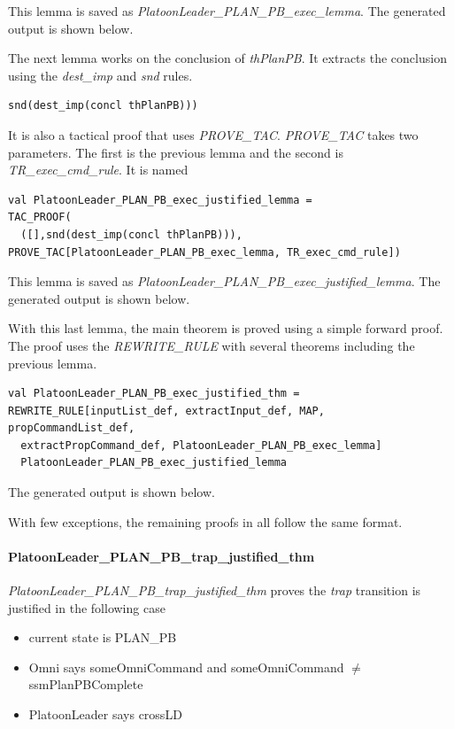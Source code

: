 \documentclass[../../main/main.tex]{subfiles}
\begin{document}
This lemma is saved as \textit{PlatoonLeader_PLAN_PB_exec_lemma}.  The  generated output is shown below.

\HOLssmPBIntegratedTheoremsPlatoonLeaderXXPLANXXPBXXexecXXlemma

The next lemma works on the conclusion of \textit{thPlanPB}.  It extracts the conclusion using the \textit{dest_imp} and \textit{snd} rules. 

\begin{lstlisting}
snd(dest_imp(concl thPlanPB)))
\end{lstlisting}

 It is also a tactical proof that uses \textit{PROVE_TAC}.  \textit{PROVE_TAC} takes two parameters. The first is the previous lemma and the second is \textit{TR_exec_cmd_rule}.  It is named 

\begin{lstlisting}
val PlatoonLeader_PLAN_PB_exec_justified_lemma =
TAC_PROOF(
  ([],snd(dest_imp(concl thPlanPB))),
PROVE_TAC[PlatoonLeader_PLAN_PB_exec_lemma, TR_exec_cmd_rule])
\end{lstlisting}

This lemma is saved as \textit{PlatoonLeader_PLAN_PB_exec_justified_lemma}.  The  generated output is shown below.

\HOLssmPBIntegratedTheoremsPlatoonLeaderXXPLANXXPBXXexecXXjustifiedXXlemma


With this last lemma, the main theorem is proved using a simple forward proof.  The proof uses the \textit{REWRITE_RULE} with several theorems including the previous lemma. 

\begin{lstlisting}
val PlatoonLeader_PLAN_PB_exec_justified_thm =
REWRITE_RULE[inputList_def, extractInput_def, MAP, propCommandList_def,
  extractPropCommand_def, PlatoonLeader_PLAN_PB_exec_lemma]
  PlatoonLeader_PLAN_PB_exec_justified_lemma
\end{lstlisting}

The  generated output is shown below.
\HOLssmPBIntegratedTheoremsPlatoonLeaderXXPLANXXPBXXexecXXjustifiedXXthm

With few exceptions, the remaining proofs in all  follow the same format.

\paragraph*{PlatoonLeader_PLAN_PB_trap_justified_thm}
\textit{PlatoonLeader_PLAN_PB_trap_justified_thm} proves the \textit{trap} transition is justified in the following case
\begin{itemize}
\item current state is PLAN_PB
\item Omni says someOmniCommand and someOmniCommand $\neq$ ssmPlanPBComplete
\item PlatoonLeader says crossLD
\end{itemize}
\end{document}
